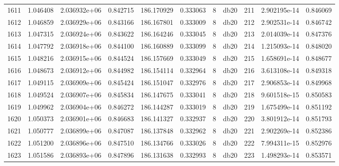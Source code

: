 \begin{tabular}{lrrrrrrlrrr}
1611 &    1.046408 &        2.036932e+06 &  0.842715 &              186.170929 &    0.333063 &       8 &         db20 &    211 &   2.902195e-14 &      0.846069 \\
1612 &    1.046859 &        2.036929e+06 &  0.843166 &              186.167801 &    0.333009 &       8 &         db20 &    212 &   2.902531e-14 &      0.846742 \\
1613 &    1.047315 &        2.036924e+06 &  0.843622 &              186.164246 &    0.333045 &       8 &         db20 &    213 &   2.014039e-14 &      0.847376 \\
1614 &    1.047792 &        2.036918e+06 &  0.844100 &              186.160889 &    0.333099 &       8 &         db20 &    214 &   1.215093e-14 &      0.848020 \\
1615 &    1.048216 &        2.036915e+06 &  0.844524 &              186.157669 &    0.333049 &       8 &         db20 &    215 &   1.658691e-14 &      0.848677 \\
1616 &    1.048673 &        2.036912e+06 &  0.844982 &              186.154114 &    0.332964 &       8 &         db20 &    216 &   3.613108e-14 &      0.849318 \\
1617 &    1.049115 &        2.036909e+06 &  0.845424 &              186.151047 &    0.332976 &       8 &         db20 &    217 &   2.906853e-14 &      0.849968 \\
1618 &    1.049524 &        2.036907e+06 &  0.845834 &              186.147675 &    0.333041 &       8 &         db20 &    218 &   9.601518e-15 &      0.850583 \\
1619 &    1.049962 &        2.036904e+06 &  0.846272 &              186.144287 &    0.333019 &       8 &         db20 &    219 &   1.675499e-14 &      0.851192 \\
1620 &    1.050373 &        2.036901e+06 &  0.846683 &              186.141327 &    0.332937 &       8 &         db20 &    220 &   3.801912e-14 &      0.851793 \\
1621 &    1.050777 &        2.036899e+06 &  0.847087 &              186.137848 &    0.332962 &       8 &         db20 &    221 &   2.902269e-14 &      0.852386 \\
1622 &    1.051200 &        2.036896e+06 &  0.847510 &              186.134766 &    0.333026 &       8 &         db20 &    222 &   7.994311e-15 &      0.852976 \\
1623 &    1.051586 &        2.036893e+06 &  0.847896 &              186.131638 &    0.332993 &       8 &         db20 &    223 &   1.498293e-14 &      0.853571 \\

\end{tabular}
